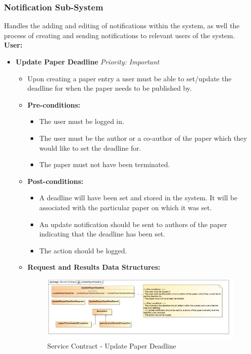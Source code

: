\documentclass{article}
\begin{document}
				\cleardoublepage
			\subsubsection{Notification Sub-System}\label{subsubsec:notification}
				Handles the adding and editing of notifications within the system, as well the process of creating and sending notifications to relevant users of the system.\\
				[3mm]
				\textbf{User:}
				\begin{itemize}
					\item \textbf{Update Paper Deadline} \hfill \textit{Priority: Important}
					\begin{itemize}
						\item Upon creating a paper entry a user must be able to set/update the deadline for when the paper needs to be published by.
						\item \textbf{Pre-conditions:}
						\begin{itemize}
							\item The user must be logged in.
							\item The user must be the author or a co-author of the paper which they would like to set the deadline for.
							\item The paper must not have been terminated.
						\end{itemize}
						\item \textbf{Post-conditions:}
						\begin{itemize}
							\item A deadline will have been set and stored in the system. It will be associated with the particular paper on which it was set.
							\item An update notification should be sent to authors of the paper indicating that the deadline has been set.
							\item The action should be logged.
						\end{itemize}
						\item \textbf{Request and Results Data Structures:}
						\begin{figure}[H]
							\includegraphics[width=\linewidth]{../Diagrams/ServiceContracts/Notification subsystem/UpdatePaperDeadline.jpg}
							\caption{Service Contract - Update Paper Deadline}
						\end{figure}
					\end{itemize}						
				\end{itemize}
				
\end{document}
